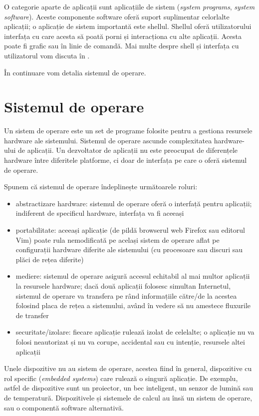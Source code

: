 O categorie aparte de aplicații sunt aplicațiile de sistem (\textit{system programs}, \textit{system software}).
Aceste componente software oferă suport suplimentar celorlalte aplicații;
o aplicație de sistem importantă este shellul.
Shellul oferă utilizatorului interfața cu care acesta să poată porni și interacționa cu alte aplicații.
Acesta poate fi grafic sau în linie de comandă.
Mai multe despre shell și interfața cu utilizatorul vom discuta în .

În continuare vom detalia sistemul de operare.

\section{Sistemul de operare}
\label{sec:intro:os}

Un sistem de operare este un set de programe folosite pentru a gestiona resursele hardware ale sistemului.
Sistemul de operare ascunde complexitatea hardware-ului de aplicații.
Un dezvoltator de aplicații nu este preocupat de diferențele hardware între diferitele platforme, ci doar de interfața pe care o oferă sistemul de operare.

Spunem că sistemul de operare îndeplinește următoarele roluri:

\begin{itemize}
  \item abstractizare hardware: sistemul de operare oferă o interfață pentru aplicații;
    indiferent de specificul hardware, interfața va fi aceeași
  \item portabilitate: aceeași aplicație (de pildă browserul web Firefox sau editorul Vim) poate rula nemodificată pe același sistem de operare aflat pe configurații hardware diferite ale sistemului (cu procesoare sau discuri sau plăci de rețea diferite)
  \item mediere: sistemul de operare asigură accesul echitabil al mai multor aplicații la resursele hardware;
    dacă două aplicații folosesc simultan Internetul, sistemul de operare va transfera pe rând informațiile către/de la acestea folosind placa de rețea a sistemului, având în vedere să nu amestece fluxurile de transfer
  \item securitate/izolare: fiecare aplicație rulează izolat de celelalte;
    o aplicație nu va folosi neautorizat și nu va corupe, accidental sau cu intenție, resursele altei aplicații
\end{itemize}

Unele dispozitive nu au sistem de operare, acestea fiind în general, dispozitive cu rol specific (\textit{embedded systems}) care rulează o singură aplicație.
De exemplu, astfel de dispozitive sunt un proiector, un bec inteligent, un senzor de lumină sau de temperatură.
Dispozitivele și sistemele de calcul au însă un sistem de operare, sau o componentă software alternativă.

